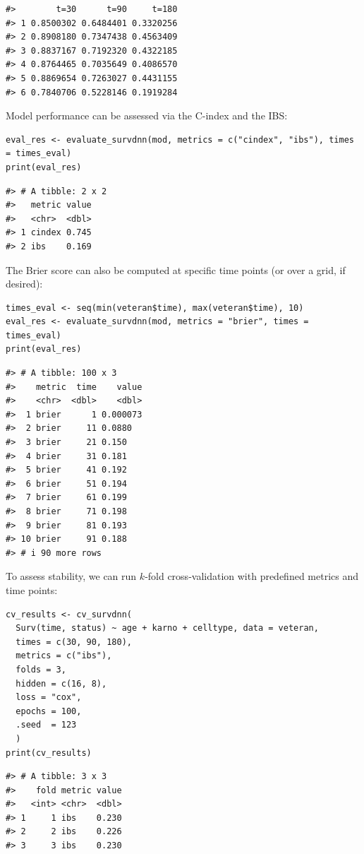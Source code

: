 \begin{verbatim}
#>        t=30      t=90     t=180
#> 1 0.8500302 0.6484401 0.3320256
#> 2 0.8908180 0.7347438 0.4563409
#> 3 0.8837167 0.7192320 0.4322185
#> 4 0.8764465 0.7035649 0.4086570
#> 5 0.8869654 0.7263027 0.4431155
#> 6 0.7840706 0.5228146 0.1919284
\end{verbatim}

Model performance can be assessed via the C-index and the IBS:

\begin{verbatim}
eval_res <- evaluate_survdnn(mod, metrics = c("cindex", "ibs"), times = times_eval)
print(eval_res)
\end{verbatim}

\begin{verbatim}
#> # A tibble: 2 x 2
#>   metric value
#>   <chr>  <dbl>
#> 1 cindex 0.745
#> 2 ibs    0.169
\end{verbatim}

The Brier score can also be computed at specific time points (or over a grid, if desired):

\begin{verbatim}
times_eval <- seq(min(veteran$time), max(veteran$time), 10)
eval_res <- evaluate_survdnn(mod, metrics = "brier", times = times_eval)
print(eval_res)
\end{verbatim}

\begin{verbatim}
#> # A tibble: 100 x 3
#>    metric  time    value
#>    <chr>  <dbl>    <dbl>
#>  1 brier      1 0.000073
#>  2 brier     11 0.0880  
#>  3 brier     21 0.150   
#>  4 brier     31 0.181   
#>  5 brier     41 0.192   
#>  6 brier     51 0.194   
#>  7 brier     61 0.199   
#>  8 brier     71 0.198   
#>  9 brier     81 0.193   
#> 10 brier     91 0.188   
#> # i 90 more rows
\end{verbatim}

To assess stability, we can run \(k\)‑fold cross‑validation with predefined metrics and time points:

\begin{verbatim}
cv_results <- cv_survdnn(
  Surv(time, status) ~ age + karno + celltype, data = veteran,
  times = c(30, 90, 180),
  metrics = c("ibs"),
  folds = 3,
  hidden = c(16, 8),
  loss = "cox",
  epochs = 100,
  .seed  = 123
  )
print(cv_results)
\end{verbatim}

\begin{verbatim}
#> # A tibble: 3 x 3
#>    fold metric value
#>   <int> <chr>  <dbl>
#> 1     1 ibs    0.230
#> 2     2 ibs    0.226
#> 3     3 ibs    0.230
\end{verbatim}

